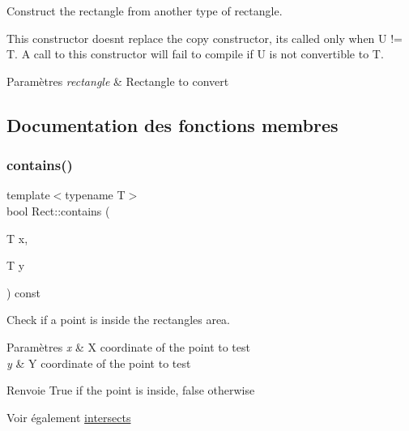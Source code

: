 Construct the rectangle from another type of rectangle. 

This constructor doesn\textquotesingle{}t replace the copy constructor, it\textquotesingle{}s called only when U != T. A call to this constructor will fail to compile if U is not convertible to T.


\begin{DoxyParams}{Paramètres}
{\em rectangle} & Rectangle to convert \\
\hline
\end{DoxyParams}


\subsection{Documentation des fonctions membres}
\mbox{\label{classsf_1_1Rect_a1d8a4a3aecec18310f6e3e23db43dfb8}} 
\subsubsection{\texorpdfstring{contains()}{contains()}\hspace{0.1cm}{\footnotesize\ttfamily [1/2]}}
{\footnotesize\ttfamily template$<$typename T$>$ \\
bool Rect\+::contains (\begin{DoxyParamCaption}\item[{T}]{x,  }\item[{T}]{y }\end{DoxyParamCaption}) const}



Check if a point is inside the rectangle\textquotesingle{}s area. 


\begin{DoxyParams}{Paramètres}
{\em x} & X coordinate of the point to test \\
\hline
{\em y} & Y coordinate of the point to test\\
\hline
\end{DoxyParams}
\begin{DoxyReturn}{Renvoie}
True if the point is inside, false otherwise
\end{DoxyReturn}
\begin{DoxySeeAlso}{Voir également}
\hyperlink{classsf_1_1Rect_ad90321b1135cad31589f2db2f9b772db}{intersects} 
\end{DoxySeeAlso}
\mbox{\label{classsf_1_1Rect_aa254e12d95ecf460ace8b2784fbab5eb}} 
